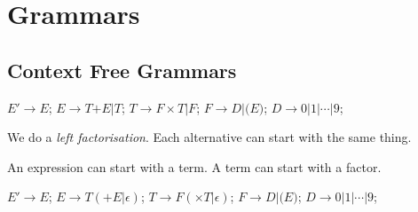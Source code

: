 
\chapter{Grammars}

\section{Context Free Grammars}

\begin{example}
$E' \rightarrow E$;
$E \rightarrow T \text{+} E | T$;
$T \rightarrow F \times T | F$;
$F \rightarrow D | \text{(} E \text{)}$;
$D \rightarrow \text{0} | \text{1} | \dotsm | \text{9}$;
\end{example}

We do a \textit{left factorisation}. 
Each alternative can start with the same thing. 

An expression can start with a term.
A term can start with a factor.


$E' \rightarrow E$;
$E \rightarrow T (\text{+} E | \epsilon)$;
$T \rightarrow F (\times T | \epsilon)$;
$F \rightarrow D | \text{(} E \text{)}$;
$D \rightarrow \text{0} | \text{1} | \dotsm | \text{9}$;



